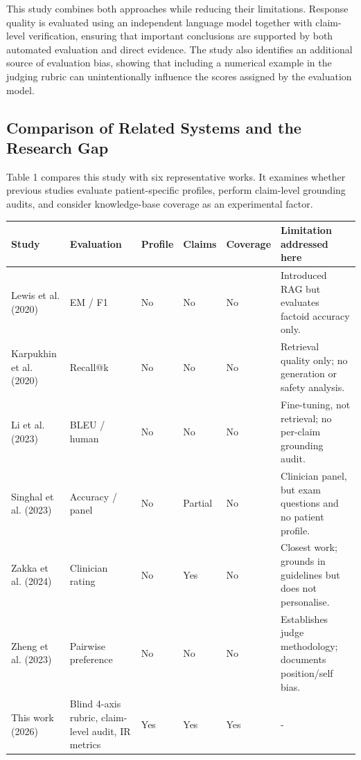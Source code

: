 This study combines both approaches while reducing their limitations. Response quality is evaluated using an independent language model together with claim-level verification, ensuring that important conclusions are supported by both automated evaluation and direct evidence. The study also identifies an additional source of evaluation bias, showing that including a numerical example in the judging rubric can unintentionally influence the scores assigned by the evaluation model.

\subsection{Comparison of Related Systems and the Research Gap}

Table 1 compares this study with six representative works. It examines whether previous studies evaluate patient-specific profiles, perform claim-level grounding audits, and consider knowledge-base coverage as an experimental factor.

\label{tab:1}
\begin{center}
\scriptsize
\setlength{\tabcolsep}{3pt}
\begin{tabular}{>{\raggedright\arraybackslash}p{}>{\raggedright\arraybackslash}p{}>{\raggedright\arraybackslash}p{}>{\raggedright\arraybackslash}p{}>{\raggedright\arraybackslash}p{}>{\raggedright\arraybackslash}p{}}
\toprule
\textbf{Study} & \textbf{Evaluation} & \textbf{Profile} & \textbf{Claims} & \textbf{Coverage} & \textbf{Limitation addressed here} \\
\midrule
Lewis et al. (2020) & EM / F1 & No & No & No & Introduced RAG but evaluates factoid accuracy only. \\
Karpukhin et al. (2020) & Recall@k & No & No & No & Retrieval quality only; no generation or safety analysis. \\
Li et al. (2023) & BLEU / human & No & No & No & Fine-tuning, not retrieval; no per-claim grounding audit. \\
Singhal et al. (2023) & Accuracy / panel & No & Partial & No & Clinician panel, but exam questions and no patient profile. \\
Zakka et al. (2024) & Clinician rating & No & Yes & No & Closest work; grounds in guidelines but does not personalise. \\
Zheng et al. (2023) & Pairwise preference & No & No & No & Establishes judge methodology; documents position/self bias. \\
This work (2026) & Blind 4-axis rubric, claim-level audit, IR metrics & Yes & Yes & Yes & - \\
\bottomrule
\end{tabular}
\end{center}

